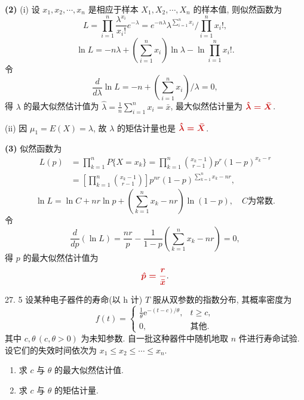 \documentclass[11pt, UTF8]{ctexart}
\newcommand{\ans}[1]{{\color{fred}\boldsymbol{#1}}}
\begin{document}
\vspace{1em}
\textbf{(2)} (i) 设 \(x_1, x_2, \cdots, x_n\) 是相应于样本 \(X_1, X_2, \cdots, X_n\) 的样本值, 则似然函数为
\[ L = \prod_{i=1}^n \frac{\lambda^{x_i}}{x_i!} e^{-\lambda} = e^{-n\lambda} \lambda^{\sum_{i=1}^n x_i} \bigg/ \prod_{i=1}^n x_i!, \]
\[ \ln L = -n\lambda + \left(\sum_{i=1}^n x_i\right) \ln \lambda - \ln \prod_{i=1}^n x_i!. \]
令
\[ \frac{d}{d\lambda}\ln L = -n + \left(\sum_{i=1}^n x_i\right) \bigg/ \lambda = 0, \]
得 \(\lambda\) 的最大似然估计值为 \(\hat{\lambda} = \frac{1}{n}\sum_{i=1}^n x_i = \bar{x}\), 最大似然估计量为 \(\ans{\hat{\lambda} = \bar{X}}\).

(ii) 因 \(\mu_1 = E(X) = \lambda\), 故 \(\lambda\) 的矩估计量也是 \(\ans{\hat{\lambda} = \bar{X}}\).

\vspace{1em}
\textbf{(3)} 似然函数为
\begin{align*}
L(p) &= \prod_{k=1}^n P\{X = x_k\} = \prod_{k=1}^n \binom{x_k-1}{r-1} p^r (1-p)^{x_k-r} \\
     &= \left[\prod_{k=1}^n \binom{x_k-1}{r-1}\right] p^{nr} (1-p)^{\sum_{k=1}^n x_k - nr},
\end{align*}
\[ \ln L = \ln C + nr \ln p + \left(\sum_{k=1}^n x_k - nr\right) \ln(1-p), \quad C \text{为常数}. \]
令
\[ \frac{d}{dp}(\ln L) = \frac{nr}{p} - \frac{1}{1-p}\left(\sum_{k=1}^n x_k - nr\right) = 0, \]
得 \(p\) 的最大似然估计值为
\[ \ans{\hat{p} = \frac{r}{\bar{x}}}. \]

\vspace{1.5em}

\begin{problem}{2}{7. 5}
设某种电子器件的寿命(以 h 计) \(T\) 服从双参数的指数分布, 其概率密度为
\[ f(t) = \begin{cases}
\frac{1}{\theta} \mathrm{e}^{-(t-c)/\theta}, & t \ge c, \\
0, & \text{其他}.
\end{cases} \]
其中 \(c, \theta \, (c, \theta > 0)\) 为未知参数. 自一批这种器件中随机地取 \(n\) 件进行寿命试验. 设它们的失效时间依次为 \(x_1 \le x_2 \le \cdots \le x_n\).
\begin{enumerate}[label=(\arabic*)]
    \item 求 \(c\) 与 \(\theta\) 的最大似然估计值.
    \item 求 \(c\) 与 \(\theta\) 的矩估计量.
\end{enumerate}
\end{problem}
\end{document}
